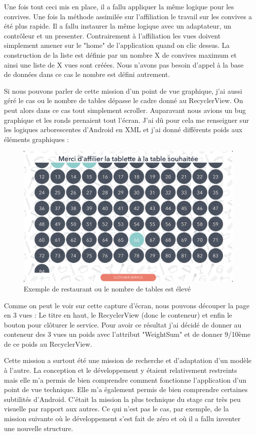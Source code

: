 \clearpage

Une fois tout ceci mis en place, il a fallu appliquer la même logique pour les convives. Une fois la méthode assimilée sur l'affiliation le travail sur les convives a été plus rapide. Il a fallu instaurer la même logique avec un adaptateur, un contrôleur et un presenter. Contrairement à l'affiliation les vues doivent simplement amener sur le "home" de l'application quand on clic dessus. La construction de la liste est définie par un nombre X de convives maximum et ainsi une liste de X vues sont créées. Nous n'avons pas besoin d'appel à la base de données dans ce cas le nombre est défini autrement.

Si nous pouvons parler de cette mission d'un point de vue graphique, j'ai aussi géré le cas ou le nombre de tables dépasse le cadre donné au RecyclerView. On peut alors dans ce cas tout simplement scroller. Auparavant nous avions un bug graphique et les ronds prenaient tout l'écran. J'ai dû pour cela me renseigner sur les logiques arborescentes d'Android en XML et j'ai donné différents poids aux éléments graphiques : 

\begin{figure}[!htp]
  \centering
  \includegraphics[width=115mm,scale=0.5]{images/affiliation_screen.png}
  \caption{Exemple de restaurant ou le nombre de tables est élevé}
  \label{fig:boat1}
\end{figure}

Comme on peut le voir sur cette capture d'écran, nous pouvons découper la page en 3 vues : Le titre en haut, le RecyclerView (donc le conteneur) et enfin le bouton pour clôturer le service. Pour avoir ce résultat j'ai décidé de donner au conteneur des 3 vues un poids avec l'attribut "WeightSum" et de donner 9/10ème de ce poids au RecyclerView.

Cette mission a surtout été une mission de recherche et d'adaptation d'un modèle à l'autre. La conception et le développement y étaient relativement restreints mais elle m'a permis de bien comprendre comment fonctionne l'application d'un point de vue technique. Elle m'a également permis de bien comprendre certaines subtilités d'Android. C'était la mission la plus technique du stage car très peu visuelle par rapport aux autres. Ce qui n'est pas le cas, par exemple, de la mission suivante où le développement s'est fait de zéro et où il a fallu inventer une nouvelle structure.

